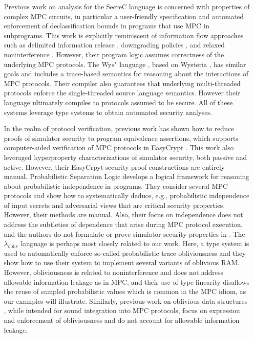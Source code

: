 Previous work on analysis for the SecreC language
\cite{almeida2018enforcing,10.1145/2637113.2637119} is concerned with
properties of complex MPC circuits, in particular a user-friendly
specification and automated enforcement of declassification bounds in
programs that use MPC in subprograms. This work is explicitly
reminiscent of information flow approaches such as delimited
information release \cite{10.1007/978-3-540-37621-7_9}, downgrading
policies \cite{li2005downgrading}, and relaxed noninterference
\cite{10.1145/1040305.1040319}. However, their program logic assumes
correctness of the underlying MPC protocols.  The Wys$^\star$ language
\cite{wysstar}, based on Wysteria \cite{rastogi2014wysteria}, has
similar goals and includes a trace-based semantics for reasoning about
the interactions of MPC protocols. Their compiler also guarantees that
underlying multi-threaded protocols enforce the single-threaded source
language semantics. However their language ultimately compiles to
protocols assumed to be secure.  All of these systems leverage type
systems to obtain automated security analyses.

In the realm of protocol verification, previous work has shown how to
reduce proofs of simulator security to program equivalence assertions,
which supports computer-aided verification of MPC protocols in
EasyCrypt \cite{8429300}. This work also leveraged hyperproperty
characterizations of simulator security, both passive and
active. However, their EasyCrpyt security proof constructions are
entirely manual. Probabilistic Separation Logic
\cite{barthe2019probabilistic} develops a logical framework for
reasoning about probabilistic independence in programs.  They consider
several MPC protocols and show how to systematically deduce, e.g.,
probabilistic independence of input secrets and adversarial views that
are critical security properties.  However, their methods are manual. 
Also, their focus on independence does not address the subtleties of
dependence that arise during MPC protocol execution, and the authors
do not formulate or prove simulator security properties in
\cite{barthe2019probabilistic}. The $\lambda_{\mathrm{obliv}}$
language \cite{darais2019language} is perhaps most closely related to
our work. Here, a type system is used to automatically enforce
so-called probabilistic trace obliviousness and they show how to use
their system to implement several variants of oblivious RAM. However,
obliviousness is related to noninterference and does not address
allowable information leakage as in MPC, and their use of type
linearity disallows the reuse of sampled probabilistic values which is
common in the MPC idiom, as our examples will illustrate. Similarly,
previous work on oblivious data structures \cite{10.1145/3498713},
while intended for sound integration into MPC protocols, focus on
expression and enforcement of obliviousness and do not account for
allowable information leakage.


